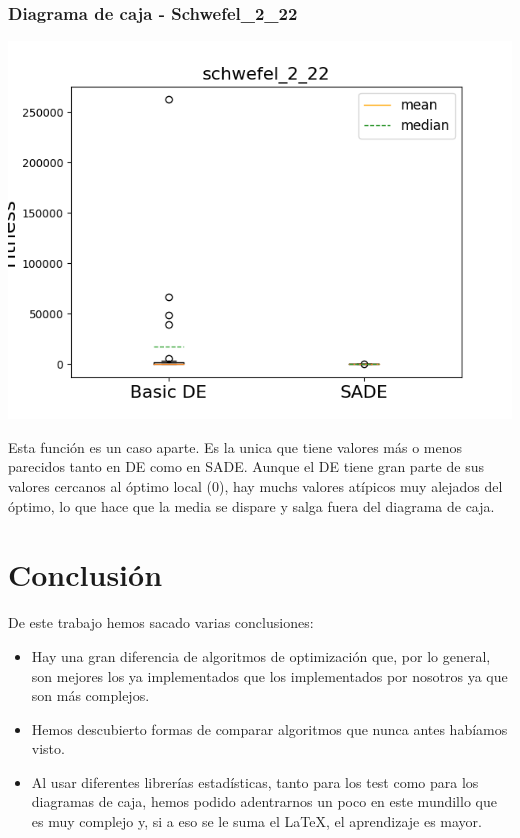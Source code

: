 \documentclass[11pt, a4paper, titlepage]{article}
\begin{document}
\subsubsection{Diagrama de caja - Schwefel\_2\_22}
\begin{center}
\includegraphics[scale=0.85]{schwefel_2_22}
\end{center}
Esta función es un caso aparte. Es la unica que tiene valores más o menos parecidos tanto en DE como en SADE. Aunque el DE tiene gran parte de sus valores cercanos al óptimo local (0), hay muchs valores atípicos muy alejados del óptimo, lo que hace que la media se dispare y salga fuera del diagrama de caja.
\section{Conclusión}
De este trabajo hemos sacado varias conclusiones:
\begin{itemize}
\item Hay una gran diferencia de algoritmos de optimización que, por lo general, son mejores los ya implementados que los implementados por nosotros ya que son más complejos.
\item Hemos descubierto formas de comparar algoritmos que nunca antes habíamos visto.
\item Al usar diferentes librerías estadísticas, tanto para los test como para los diagramas de caja, hemos podido adentrarnos un poco en este mundillo que es muy complejo y, si a eso se le suma el \LaTeX, el aprendizaje es mayor.
\end{itemize}
\end{document}
